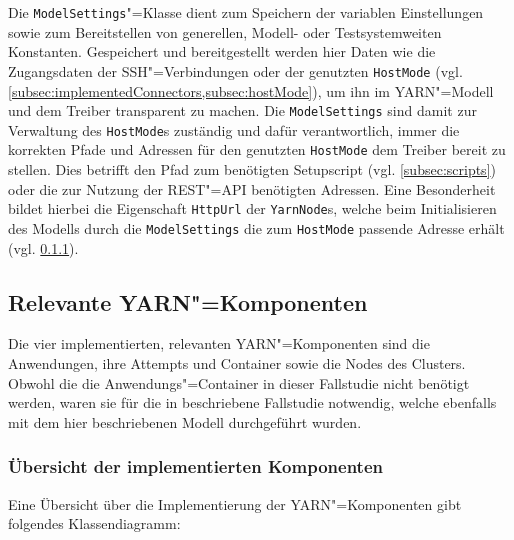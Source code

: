 Die \texttt{ModelSettings}"=Klasse dient zum Speichern der variablen Einstellungen sowie zum Bereitstellen von generellen, Modell- oder Testsystemweiten Konstanten.
Gespeichert und bereitgestellt werden hier Daten wie \zB die Zugangsdaten der SSH"=Verbindungen oder der genutzten \texttt{HostMode} (vgl.  \cref{subsec:implementedConnectors,subsec:hostMode}), um ihn im \ac{YARN}"=Modell und dem Treiber transparent zu machen.
Die \texttt{ModelSettings} sind damit zur Verwaltung des \texttt{HostMode}s zuständig und dafür verantwortlich, immer die korrekten Pfade und Adressen für den genutzten \texttt{HostMode} dem Treiber bereit zu stellen.
Dies betrifft \zB den Pfad zum benötigten Setupscript (vgl. \cref{subsec:scripts}) oder die zur Nutzung der REST"=API benötigten Adressen.
Eine Besonderheit bildet hierbei die Eigenschaft \texttt{HttpUrl} der \texttt{YarnNode}s, welche beim Initialisieren des Modells durch die \texttt{ModelSettings} die zum \texttt{HostMode} passende Adresse erhält (vgl. \cref{subsubsec:yarnComponentsOverview}).

\subsection{Relevante \acs{YARN}"=Komponenten}
\label{subsec:yarnComponents}

Die vier implementierten, relevanten \ac{YARN}"=Komponenten sind die Anwendungen, ihre Attempts und Container sowie die Nodes des Clusters.
Obwohl die die Anwendungs"=Container in dieser Fallstudie nicht benötigt werden, waren sie für die in \cite{Eberhardinger2018} beschriebene Fallstudie notwendig, welche ebenfalls mit dem hier beschriebenen Modell durchgeführt wurden.

\subsubsection{Übersicht der implementierten Komponenten}
\label{subsubsec:yarnComponentsOverview}

Eine Übersicht über die Implementierung der \ac{YARN}"=Komponenten gibt folgendes Klassendiagramm:

